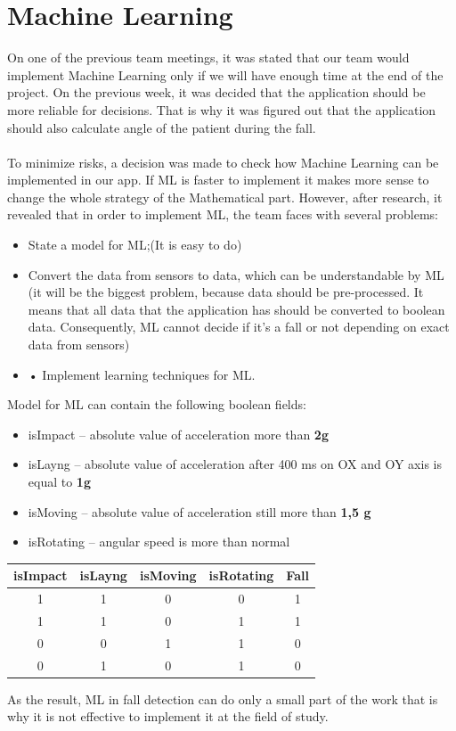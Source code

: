 \documentclass[conference,12pt]{IEEETran}
\begin{document}
\section{Machine Learning}
On one of the previous team meetings, it was stated that our team would implement Machine Learning only if we will have enough time at the end of the project. On the previous week, it was decided that the application should be more reliable for decisions. That is why it was figured out that the application should also calculate angle of the patient during the fall.\\\\
To minimize risks, a decision was made to check how Machine Learning can be implemented in our app. If ML is faster to implement it makes more sense to change the whole strategy of the Mathematical part. However, after research, it revealed that in order to implement ML, the team faces with several problems:
\begin{itemize}
	\item State a model for ML;(It is easy to do)
	\item Convert the data from sensors to data, which can be understandable by ML (it will be the biggest problem, because data should be pre-processed. It means that all data that the application has should be converted to boolean data. Consequently, ML cannot decide if it's a fall or not depending on exact data from sensors)
	\item •	Implement learning techniques for ML.
\end{itemize}
Model for ML can contain the following boolean fields: 
\begin{itemize}
	\item isImpact – absolute value of acceleration more than \textbf{2g}
	\item isLayng – absolute value of acceleration after 400 ms on OX and OY axis is equal to \textbf{1g}
	\item isMoving – absolute value of acceleration still more than \textbf{1,5 g}
	\item isRotating – angular speed is more than normal
\end{itemize}

\begin{table}[!h]	
	\begin{center}
		{\renewcommand{\arraystretch}{2}%
		\begin{tabular}{||c|c|c|c|c||} 
			\hline
			\textbf{isImpact} & \textbf{isLayng} & \textbf{isMoving} &\textbf{isRotating} & \textbf{Fall} \\ [0.5ex] 
			\hline\hline
			1 & 1 & 0 & 0 & 1 \\ 
			\hline
			1 & 1 & 0 & 1 & 1 \\
			\hline
			0 & 0 & 1 & 1 & 0 \\
			\hline
			0 & 1 & 0 & 1 & 0 \\  [1ex]
			\hline  
		\end{tabular}
	}
	\end{center}
\end{table}
As the result, ML in fall detection can do only a small part of the work that is why it is not effective to implement it at the field of study. 
\end{document}
